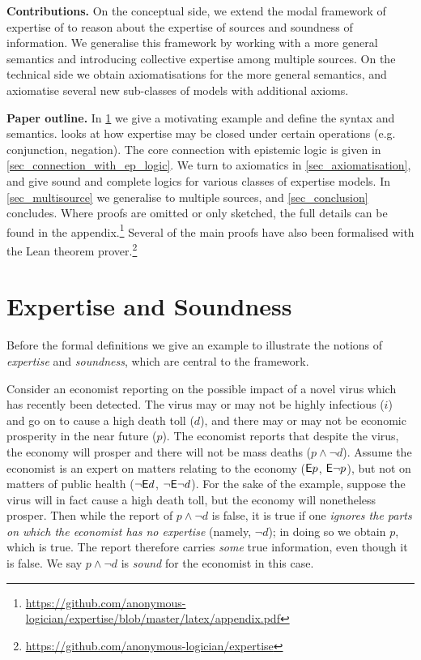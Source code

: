 \textbf{Contributions.} On the conceptual side, we extend the modal framework
of expertise of \citet{singleton2021logic} to reason about the expertise of
sources and soundness of information. We generalise this framework by working
with a more general semantics and introducing collective expertise among
multiple sources.
%
On the technical side we obtain axiomatisations for the more general semantics,
and axiomatise several new sub-classes of models with additional axioms.

\textbf{Paper outline.} In \cref{sec_expertise_and_soundness} we give a
motivating example and define the syntax and semantics.
 looks at how expertise may be closed under
certain operations (e.g. conjunction, negation). The core connection with
epistemic logic is given in \cref{sec_connection_with_ep_logic}. We turn to
axiomatics in \cref{sec_axiomatisation}, and give sound and complete logics for
various classes of expertise models. In \cref{sec_multisource} we generalise to
multiple sources, and \cref{sec_conclusion} concludes. Where proofs are omitted
or only sketched, the full details can be found in the
appendix.\footnote{\url{https://github.com/anonymous-logician/expertise/blob/master/latex/appendix.pdf}}
Several of the main proofs have also been formalised with the Lean theorem
prover.\footnote{\url{https://github.com/anonymous-logician/expertise}}

\section{Expertise and Soundness}
\label{sec_expertise_and_soundness}

Before the formal definitions we give an example to illustrate the notions of
\emph{expertise} and \emph{soundness}, which are central to the framework.

\begin{example}
    \label{ex_economist_motivation}

    Consider an economist reporting on the possible impact of a novel virus
    which has recently been detected. The virus may or may not be highly
    infectious ($i$) and go on to cause a high death toll ($d$), and there may
    or may not be economic prosperity in the near future ($p$). The economist
    reports that despite the virus, the economy will prosper and there will not
    be mass deaths ($p \land \neg d$). Assume the economist is an expert on
    matters relating to the economy ($\mathsf{E} p$, $\mathsf{E}\neg p$), but not on matters of
    public health ($\neg\mathsf{E} d$, $\neg\mathsf{E}\neg d$). For the sake of the example,
    suppose the virus will in fact cause a high death toll, but the economy
    will nonetheless prosper. Then while the report of $p \land \neg d$ is
    false, it is true if one \emph{ignores the parts on which the economist has
    no expertise} (namely, $\neg d$); in doing so we obtain $p$, which is true.
    The report therefore carries \emph{some} true information, even though it
    is false. We say $p \land \neg d$ is \emph{sound} for the economist in this
    case.

\end{example}

